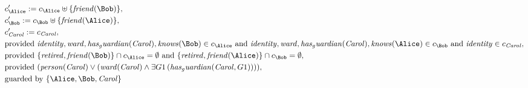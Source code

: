 \begin{align*}
&
c'_
{
\Alice
}
 := 
c_
{
\Alice
}
 \uplus 
\{
\mathit{
friend
}
(
\Bob
)
\}
,\\
&
c'_
{
\Bob
}
 := 
c_
{
\Bob
}
 \uplus 
\{
\mathit{
friend
}
(
\Alice
)
\}
,\\
&
c'_
{
\mathit{Carol}
}
 := 
c_
{
\mathit{Carol}
}
,\\
&
\text{provided } 
\mathit{
identity
}
,
\mathit{
ward
}
,
\mathit{
has_guardian
}
(
\mathit{Carol}
)
,
\mathit{
knows
}
(
\Bob
)
 \in c_
{
\Alice
}
 \text{ and } 
\mathit{
identity
}
,
\mathit{
ward
}
,
\mathit{
has_guardian
}
(
\mathit{Carol}
)
,
\mathit{
knows
}
(
\Alice
)
 \in c_
{
\Bob
}
 \text{ and } 
\mathit{
identity
}
 \in c_
{
\mathit{Carol}
}
,\\
&
\text{provided } 
\{
\mathit{
retired
}
,
\mathit{
friend
}
(
\Bob
)
\}
 \cap c_
{
\Alice
}
 = \emptyset
 \text{ and } 
\{
\mathit{
retired
}
,
\mathit{
friend
}
(
\Alice
)
\}
 \cap c_
{
\Bob
}
 = \emptyset
,\\
&
\text{provided } 
(
\mathit{
person
}
(
\mathit{Carol}
)
\lor
(
\mathit{
ward
}
(
\mathit{Carol}
)
\land
\exists 
G1
\,(
\mathit{
has_guardian
}
(
\mathit{Carol}
,
G1
)
)
)
)
,\\
&
\text{guarded by } \{
\Alice
,
\Bob
,
\mathit{Carol}
\}
\end{align*}

